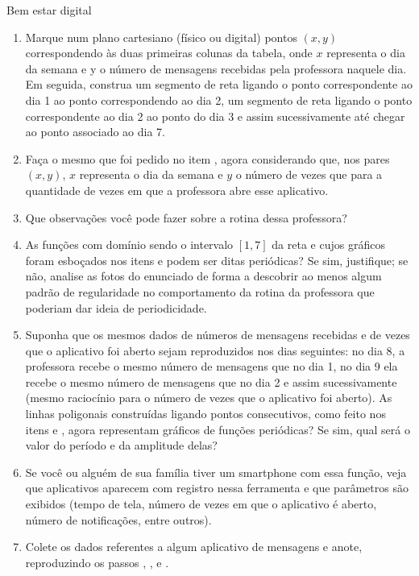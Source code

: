 \begin{task}{Bem estar digital}
\begin{enumerate}
\item Marque num plano cartesiano (físico ou digital) pontos $(x,y)$ correspondendo às duas primeiras colunas da tabela, onde $x$ representa o dia da semana e y o número de mensagens recebidas pela professora naquele dia. Em seguida, construa um segmento de reta ligando o ponto correspondente ao dia 1 ao ponto correspondendo ao dia 2, um segmento de reta ligando o ponto correspondente ao dia 2 ao ponto do dia 3 e assim sucessivamente até chegar ao ponto associado ao dia 7.
\item Faça o mesmo que foi pedido no item , agora considerando que, nos pares $(x,y)$, $x$ representa o dia da semana e $y$ o número de vezes que para a quantidade de vezes em que a professora abre esse aplicativo.
\item Que observações você pode fazer sobre a rotina dessa professora?
\item As funções com domínio sendo o intervalo $[1,7]$ da reta e cujos gráficos foram esboçados nos itens  e  podem ser ditas periódicas? Se sim, justifique; se não, analise as fotos do enunciado de forma a descobrir ao menos algum padrão de regularidade no comportamento da rotina da professora que poderiam dar ideia de periodicidade.
\item Suponha que os mesmos dados de números de mensagens recebidas e de vezes que o aplicativo foi aberto sejam reproduzidos nos dias seguintes: no dia 8, a professora recebe o mesmo número de mensagens que no dia 1, no dia 9 ela recebe o mesmo número de mensagens que no dia 2 e assim sucessivamente (mesmo raciocínio para o número de vezes que o aplicativo foi aberto). As linhas poligonais construídas ligando pontos consecutivos, como feito nos itens  e , agora representam gráficos de funções periódicas? Se sim, qual será o valor do período e da amplitude delas?
\item Se você ou alguém de sua família tiver um smartphone com essa função, veja que aplicativos aparecem com registro nessa ferramenta e que parâmetros são exibidos (tempo de tela, número de vezes em que o aplicativo é aberto, número de notificações, entre outros).
\item Colete os dados referentes a algum aplicativo de mensagens e anote, reproduzindo os passos , ,  e .

\end{enumerate}

\end{task}


